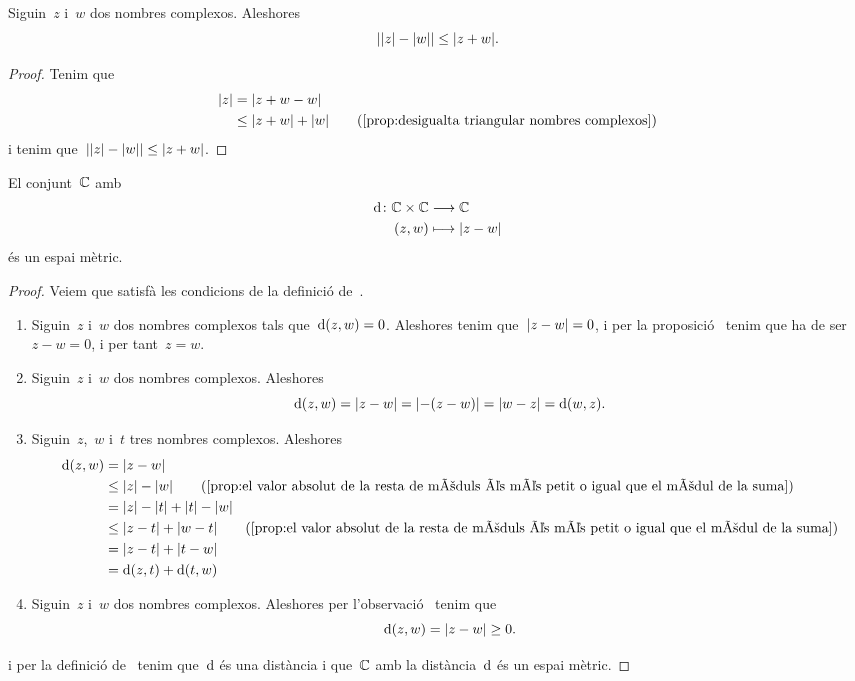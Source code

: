 \documentclass[../Apunts.tex]{subfiles}
\begin{document}
	\begin{proposition}
		\label{prop:el valor absolut de la resta de mòduls és més petit o igual que el mòdul de la suma}
		Siguin~\(z\) i~\(w\) dos nombres complexos. Aleshores
		\[\abs{\modul{z}-\modul{w}}\leq\modul{z+w}.\]
		\begin{proof}
			Tenim que
			\begin{align*}
				\modul{z}&=\modul{z+w-w} \\
				&\leq\modul{z+w}+\modul{w} \tag{\ref{prop:desigualta triangular nombres complexos}}
			\end{align*}
			i tenim que~\(\abs{\modul{z}-\modul{w}}\leq\modul{z+w}\).
		\end{proof}
	\end{proposition}
	\begin{proposition}
		\label{prop:els complexos són un espai mètric}
		El conjunt~\(\mathbb{C}\) amb
		\begin{align*}
			\distancia\colon\CC\times\CC&\longrightarrow\CC \\
			(z,w)&\longmapsto\modul{z-w}
		\end{align*}
		és un espai mètric.
		\begin{proof}
			Veiem que satisfà les condicions de la definició de~.
			\begin{enumerate}
				\item Siguin~\(z\) i~\(w\) dos nombres complexos tals que~\(\operatorname{d}(z,w)=0\). Aleshores tenim que~\(\modul{z-w}=0\), i per la proposició~ tenim que ha de ser~\(z-w=0\), i per tant~\(z=w\).
				\item Siguin~\(z\) i~\(w\) dos nombres complexos. Aleshores
				\[\distancia(z,w)=\modul{z-w}=\modul{-(z-w)}=\modul{w-z}=\distancia(w,z).\]
				\item Siguin~\(z\),~\(w\) i~\(t\) tres nombres complexos. Aleshores
				\begin{align*}
					\distancia(z,w)&=\modul{z-w} \\
					&\leq\modul{z}-\modul{w} \tag{\ref{prop:el valor absolut de la resta de mòduls és més petit o igual que el mòdul de la suma}}\\
					&=\modul{z}-\modul{t}+\modul{t}-\modul{w} \\
					&\leq\modul{z-t}+\modul{w-t} \tag{\ref{prop:el valor absolut de la resta de mòduls és més petit o igual que el mòdul de la suma}}\\
					&=\modul{z-t}+\modul{t-w} \\
					&=\distancia(z,t)+\distancia(t,w)
				\end{align*}
				\item Siguin~\(z\) i~\(w\) dos nombres complexos. Aleshores per l'observació~ tenim que
				\[\distancia(z,w)=\modul{z-w}\geq0.\]
			\end{enumerate}
			i per la definició de~ tenim que~\(\operatorname{d}\) és una distància i que~\(\mathbb{C}\) amb la distància~\(\operatorname{d}\) és un espai mètric.
		\end{proof}
	\end{proposition}
\end{document}
